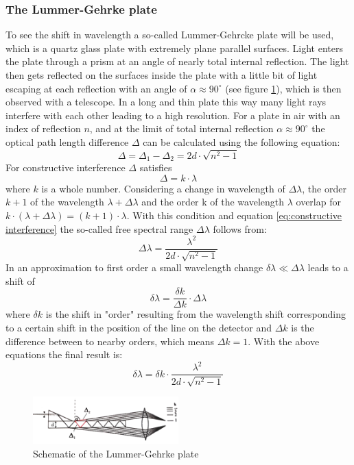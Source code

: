 \documentclass[12pt]{article}
\begin{document}
\subsubsection{The Lummer-Gehrke plate}
To see the shift in wavelength a so-called Lummer-Gehrcke plate  will be used, which is a quartz glass plate with extremely plane parallel surfaces. Light enters the plate through a prism at an angle of nearly total internal reflection. The light then gets reflected on the surfaces inside the plate with a little bit of light escaping at each reflection with an angle of $\alpha \approx 90^\circ$ (see figure \ref{fig:lummergehrke}), which is then observed with a telescope. In a long and thin plate this way many light rays interfere with each other leading to a high resolution. For a plate in air with an index of reflection $n$, and at the limit of total internal reflection $\alpha\approx 90 ^\circ$ the optical path length difference $\Delta$ can be calculated using the following equation:
\begin{equation}
\Delta=\Delta_1-\Delta_2=2d \cdot \sqrt{n^2-1}
\end{equation}
For constructive interference $\Delta$ satisfies
\begin{equation}
\Delta=k\cdot\lambda 
\label{eq:constructive interference}
\end{equation} 
where $k$ is a whole number. Considering a change in wavelength of $\Delta\lambda$, the order $k+1$ of the wavelength $\lambda+\Delta\lambda$ and the order k of the wavelength $\lambda$ overlap for $k \cdot (\lambda+\Delta\lambda)=(k+1)\cdot\lambda$. With this condition and equation \ref{eq:constructive interference} the so-called free spectral range $\Delta\lambda$ follows from:
\begin{equation}
\Delta\lambda=\frac{\lambda^2}{2d \cdot \sqrt{n^2-1}}
\end{equation}
In an approximation to first order a small wavelength change $\delta\lambda \ll \Delta\lambda$ leads to a shift of 
\begin{equation}
\delta \lambda= \frac{\delta k}{\Delta k} \cdot \Delta\lambda
\end{equation}
where $\delta k$ is the shift in "order" resulting from the wavelength shift corresponding to a certain shift in the position of the line on the detector and $\Delta k$ is the difference between to nearby orders, which means $\Delta k=1$. With the above equations the final result is:
\begin{equation}
\delta\lambda=\delta k \cdot \frac{\lambda^2}{2d\cdot\sqrt{n^2-1}}
\label{dlambda}
\end{equation}
\begin{figure}
\centering
\includegraphics[width=0.5\textwidth]{fig/lummergehrke.png}
\caption{Schematic of the Lummer-Gehrke plate}
\label{fig:lummergehrke}
\end{figure}
\end{document}
